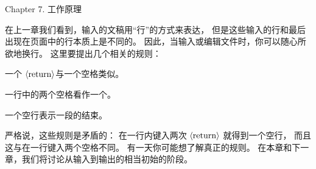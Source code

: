 


\beginchapter Chapter 7. 工作原理


\1在上一章我们看到，输入的文稿用``行''的方式来表达，
但是这些输入的行和最后出现在页面中的行本质上是不同的。%
因此，当输入或编辑文件时，你可以随心所欲地换行。%
这里要提出几个相关的规则：

\medskip
\item\bull 一个 $\langle\hbox{return}\rangle$与一个空格类似。

\smallskip
\item\bull 一行中的两个空格看作一个。

\smallskip
\item\bull 一个空行表示一段的结束。

\medskip
\noindent 严格说，这些规则是矛盾的：
在一行内键入两次 $\langle\hbox{return}\rangle$ 就得到一个空行，
而且这与在一行键入两个空格不同。%
有一天你可能想了解{真正的}规则。%
在本章和下一章，我们将讨论从输入到输出的相当初始的阶段。

